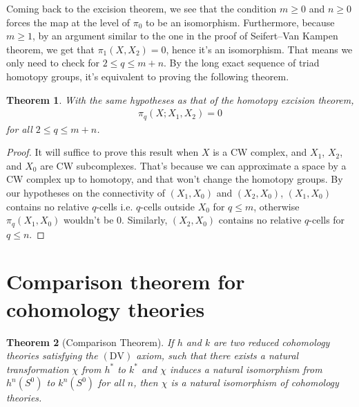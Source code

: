 \documentclass[12pt, notitlepage]{article}
\newtheorem{thm}{Theorem}[section]
\theoremstyle{definition}
\begin{document}
  Coming back to the excision theorem, we see that the condition $m \geq 0$ and $n \geq 0$ forces the map
  at the level of $\pi_0$ to be an isomorphism. Furthermore, because $m \geq 1$, by an argument similar to
  the one in the proof of Seifert--Van Kampen theorem, we get that $\pi_1(X, X_2) = 0$, hence it's an isomorphism.
  That means we only need to check for $2 \leq q \leq m+n$. By the long exact sequence of triad homotopy groups,
  it's equivalent to proving the following theorem.
  \begin{thm}
    With the same hypotheses as that of the homotopy excision theorem,
    \begin{align*}
      \pi_q(X; X_1, X_2) = 0
    \end{align*}
    for all $2 \leq q \leq m+n$.
  \end{thm}

  \begin{proof}
    It will suffice to prove this result when $X$ is a CW complex, and $X_1$, $X_2$, and $X_0$ are CW subcomplexes.
    That's because we can approximate a space by a CW complex up to homotopy, and that won't change the homotopy groups. 
    By our hypotheses on the connectivity of $(X_1, X_0)$ and $(X_2, X_0)$, $(X_1, X_0)$ contains no relative $q$-cells
    i.e. $q$-cells outside $X_0$ for $q \leq m$, otherwise $\pi_q(X_1, X_0)$ wouldn't be $0$. Similarly, $(X_2, X_0)$
    contains no relative $q$-cells for $q \leq n$.
  \end{proof}
  
\section{Comparison theorem for cohomology theories}
\label{sec:comp-theor-cohom}

\begin{thm}[Comparison Theorem]
  If $h$ and $k$ are two reduced cohomology theories satisfying the $(\mathrm{DV})$ axiom, such that
  there exists a natural transformation $\chi$ from $h^{\ast}$ to $k^{\ast}$ and $\chi$ induces a
  natural isomorphism from $h^n(S^0)$ to $k^n(S^0)$ for all $n$, then $\chi$ is a natural
  isomorphism of cohomology theories.
\end{thm}
\end{document}
